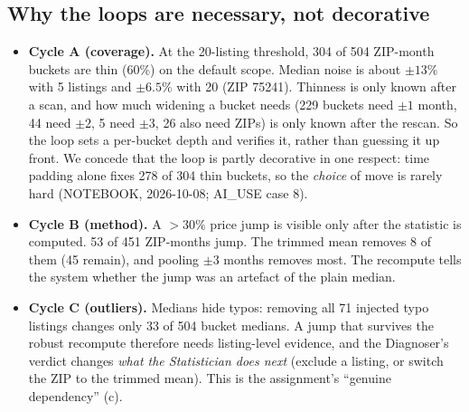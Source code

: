 \documentclass[11pt,a4paper]{article}
\begin{document}
\subsection{Why the loops are necessary, not decorative}
\begin{itemize}
  \item \textbf{Cycle A (coverage).} At the 20-listing threshold, 304 of 504 ZIP-month buckets are thin (60\%) on the
  default scope. Median noise is about $\pm13\%$ with 5 listings and $\pm6.5\%$ with 20 (ZIP 75241). Thinness is
  only known after a scan, and how much widening a bucket needs (229 buckets need $\pm1$ month, 44 need $\pm2$, 5 need
  $\pm3$, 26 also need ZIPs) is only known after the rescan. So the loop sets a per-bucket depth and verifies it, rather
  than guessing it up front. We concede that the loop is partly decorative in one respect: time padding alone fixes
  278 of 304 thin buckets, so the \emph{choice} of move is rarely hard (NOTEBOOK, 2026-10-08; AI\_USE case 8).
  \item \textbf{Cycle B (method).} A $>30\%$ price jump is visible only after the statistic is computed. 53 of 451
  ZIP-months jump. The trimmed mean removes 8 of them (45 remain), and pooling $\pm3$ months removes most. The
  recompute tells the system whether the jump was an artefact of the plain median.
  \item \textbf{Cycle C (outliers).} Medians hide typos: removing all 71 injected typo listings changes only 33 of
  504 bucket medians. A jump that survives the robust recompute therefore needs listing-level evidence, and the
  Diagnoser's verdict changes \emph{what the Statistician does next} (exclude a listing, or switch the ZIP to the
  trimmed mean). This is the assignment's ``genuine dependency'' (c).
\end{itemize}
\end{document}
